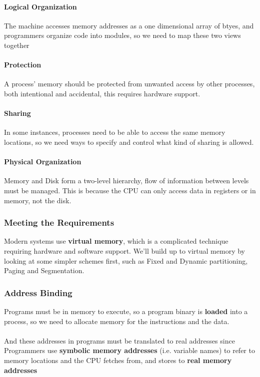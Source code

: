 \documentclass{article}
\begin{document}
\paragraph{Logical Organization} The machine accesses memory addresses as a one dimensional array of btyes, and programmers organize code into modules, so we need to map these two views together

\paragraph{Protection} A process' memory should be protected from unwanted access by other processes, both intentional and accidental, this requires hardware support.

\paragraph{Sharing} In some instances, processes need to be able to access the same memory locations, so we need ways to specify and control what kind of sharing is allowed.

\paragraph{Physical Organization} Memory and Disk form a two-level hierarchy, flow of information between levels must be managed. This is because the CPU can only access data in registers or in memory, not the disk.

\subsubsection{Meeting the Requirements}

Modern systems use \textbf{virtual memory}, which is a complicated technique requiring hardware and software support. We'll build up to virtual memory by looking at some simpler schemes first, such as Fixed and Dynamic partitioning, Paging and Segmentation.

\subsubsection{Address Binding}

Programs must be in memory to execute, so a program binary is \textbf{loaded} into a process, so we need to allocate memory for the instructions and the data.\\
\\
And these addresses in programs must be translated to real addresses since Programmers use \textbf{symbolic memory addresses} (i.e. variable names) to refer to memory locations and the CPU fetches from, and stores to \textbf{real memory addresses}
\end{document}
